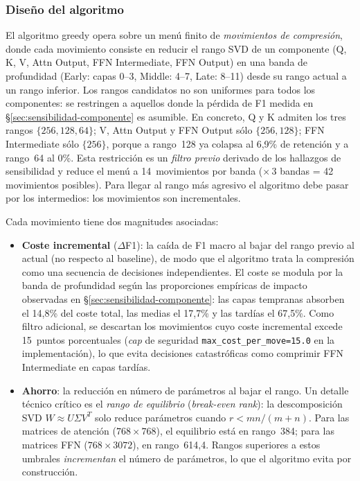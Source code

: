 \subsubsection{Diseño del algoritmo}

El algoritmo greedy opera sobre un menú finito de \emph{movimientos de
compresión}, donde cada movimiento consiste en reducir el rango SVD de un
componente (Q, K, V, Attn Output, FFN Intermediate, FFN Output) en una
banda de profundidad (Early: capas 0--3, Middle: 4--7, Late: 8--11) desde
su rango actual a un rango inferior. Los rangos candidatos no son
uniformes para todos los componentes: se restringen a aquellos donde la
pérdida de F1 medida en \S\ref{sec:sensibilidad-componente} es asumible.
En concreto, Q y K admiten los tres rangos $\{256, 128, 64\}$; V, Attn
Output y FFN Output sólo $\{256, 128\}$; FFN Intermediate sólo $\{256\}$,
porque a rango~128 ya colapsa al 6{,}9\% de retención y a rango~64 al
0\%. Esta restricción es un \emph{filtro previo} derivado de los
hallazgos de sensibilidad y reduce el menú a 14~movimientos por banda
($\times$\,3 bandas = 42 movimientos posibles). Para llegar al rango más
agresivo el algoritmo debe pasar por los intermedios: los movimientos son
incrementales.

Cada movimiento tiene dos magnitudes asociadas:

\begin{itemize}
    \item \textbf{Coste incremental} ($\Delta$F1): la caída de F1 macro
    al bajar del rango previo al actual (no respecto al baseline), de
    modo que el algoritmo trata la compresión como una secuencia de
    decisiones independientes. El coste se modula por la banda de
    profundidad según las proporciones empíricas de impacto observadas
    en \S\ref{sec:sensibilidad-componente}: las capas tempranas absorben
    el 14{,}8\% del coste total, las medias el 17{,}7\% y las tardías el
    67{,}5\%. Como filtro adicional, se descartan los movimientos cuyo
    coste incremental excede 15~puntos porcentuales (\textit{cap} de
    seguridad \texttt{max\_cost\_per\_move=15.0} en la implementación),
    lo que evita decisiones catastróficas como comprimir FFN Intermediate
    en capas tardías.

    \item \textbf{Ahorro}: la reducción en número de parámetros al bajar el
    rango. Un detalle técnico crítico es el \emph{rango de equilibrio}
    (\textit{break-even rank}): la descomposición SVD $W \approx U \Sigma V^T$
    solo reduce parámetros cuando $r < mn/(m+n)$. Para las matrices de
    atención ($768 \times 768$), el equilibrio está en rango~384; para las
    matrices FFN ($768 \times 3072$), en rango~614{,}4. Rangos superiores a
    estos umbrales \emph{incrementan} el número de parámetros, lo que el
    algoritmo evita por construcción.
\end{itemize}

